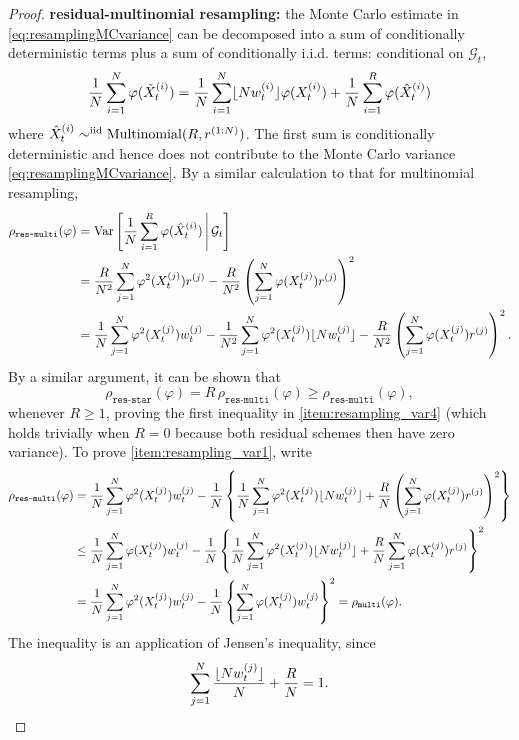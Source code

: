 \begin{proof}
\textbf{residual-multinomial resampling:} the Monte Carlo estimate in \eqref{eq:resamplingMCvariance} can be decomposed into a sum of conditionally deterministic terms plus a sum of conditionally i.i.d. terms: conditional on $\mathcal{G}_t$,
\begin{equation*}
\frac{1}{N} \sum_{i=1}^N \varphi (\tilde{X}_t^{(i)})
= \frac{1}{N} \sum_{i=1}^N \flnw \varphi (X_t^{(i)})
        + \frac{1}{N} \sum_{i=1}^R \varphi (\hat{X}_t^{(i)})
\end{equation*}
where
$ \hat{X}_t^{(i)} \sim^{\text{iid}} \Mn( R, r^{(1:N)} ) $.
The first sum is conditionally deterministic and hence does not contribute to the Monte Carlo variance \eqref{eq:resamplingMCvariance}. By a similar calculation to that for multinomial resampling,
\begin{align*}
\rho_{\texttt{res-multi}}(\varphi)
&= \V\left[ \frac{1}{N} \sum_{i=1}^R \varphi (\hat{X}_t^{(i)}) 
        \midd \mathcal{G}_t \right] \\
&= \frac{R}{N^2} \sum_{j=1}^N \varphi^2(X_t^{(j)}) r^{(j)}
        - \frac{R}{N^2} \left( \sum_{j=1}^N \varphi(X_t^{(j)}) r^{(j)} \right)^2 \\
&= \frac{1}{N} \sum_{j=1}^N \varphi^2(X_t^{(j)}) w_t^{(j)}
        - \frac{1}{N^2} \sum_{j=1}^N \varphi^2(X_t^{(j)}) \flnw[j]
        - \frac{R}{N^2} \left( \sum_{j=1}^N \varphi(X_t^{(j)}) r^{(j)} \right)^2 . 
\end{align*}
By a similar argument, it can be shown that
\begin{equation*}
\rho_{\texttt{res-star}}(\varphi)
= R \,\rho_{\texttt{res-multi}}(\varphi)
\geq \rho_{\texttt{res-multi}}(\varphi) ,
\end{equation*}
whenever $R\geq 1$, proving the first inequality in \ref{item:resampling_var4} (which holds trivially when $R=0$ because both residual schemes then have zero variance). 
To prove \ref{item:resampling_var1}, write
\begin{align*}
\rho_{\texttt{res-multi}}(\varphi)
&= \frac{1}{N} \sum_{j=1}^N \varphi^2(X_t^{(j)}) w_t^{(j)}
        - \frac{1}{N} \left\{ \frac{1}{N} \sum_{j=1}^N \varphi^2(X_t^{(j)}) \flnw[j]
        + \frac{R}{N} \left( \sum_{j=1}^N \varphi(X_t^{(j)}) r^{(j)} \right)^2
        \right\} \\
&\leq \frac{1}{N} \sum_{j=1}^N \varphi(X_t^{(j)}) w_t^{(j)}
        - \frac{1}{N} \left\{ \frac{1}{N} \sum_{j=1}^N \varphi^2(X_t^{(j)}) \flnw[j]
        + \frac{R}{N} \sum_{j=1}^N \varphi(X_t^{(j)}) r^{(j)}
        \right\}^2 \\
&= \frac{1}{N} \sum_{j=1}^N \varphi^2(X_t^{(j)}) w_t^{(j)}
        - \frac{1}{N} \left\{ \sum_{j=1}^N \varphi(X_t^{(j)}) w_t^{(j)} \right\}^2
        = \rho_{\texttt{multi}}(\varphi) .
\end{align*}
The inequality is an application of Jensen's inequality, since
\begin{equation*}
\sum_{j=1}^N \frac{ \flnw[j] }{N} + \frac{R}{N} = 1 .
\end{equation*}




\end{proof}
